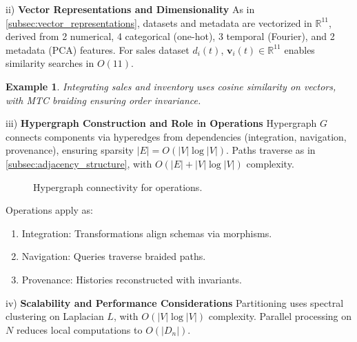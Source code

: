 \documentclass{amsart}
\newtheorem{exa}{Example}
\newcommand\R{\mathbb R}
\newcommand\bv{\mathbf v}
\begin{document}
  
ii)  \textbf{Vector Representations and Dimensionality} \label{subsec:implementation_vectors}
As in \cref{subsec:vector_representations}, datasets and metadata are vectorized in \( \R^{11} \), derived from 2 numerical, 4 categorical (one-hot), 3 temporal (Fourier), and 2 metadata (PCA) features. For sales dataset \( d_i(t) \), \( \bv_i(t) \in \R^{11} \) enables similarity searches in \( O(11) \).

\begin{exa}
Integrating sales and inventory uses cosine similarity on vectors, with MTC braiding ensuring order invariance.
\end{exa}

iii) \textbf{Hypergraph Construction and Role in Operations} \label{subsec:hypergraph_construction}
Hypergraph \( G \) connects components via hyperedges from dependencies (integration, navigation, provenance), ensuring sparsity \( |E| = O(|V| \log |V|) \). Paths traverse as in \cref{subsec:adjacency_structure}, with \( O(|E| + |V| \log |V|) \) complexity.

\begin{figure}[h!]
    \centering
    \caption{Hypergraph connectivity for operations.}
    \label{fig:hypergraph_operations}
\end{figure}

Operations apply as:
\begin{enumerate}
    \item Integration: Transformations align schemas via morphisms.
    \item Navigation: Queries traverse braided paths.
    \item Provenance: Histories reconstructed with invariants.
\end{enumerate}

iv)  \textbf{Scalability and Performance Considerations} \label{subsec:scalability_considerations}
Partitioning uses spectral clustering on Laplacian \( L \), with \( O(|V| \log |V|) \) complexity. Parallel processing on \( N \) reduces local computations to \( O(|D_n|) \).
\end{document}
